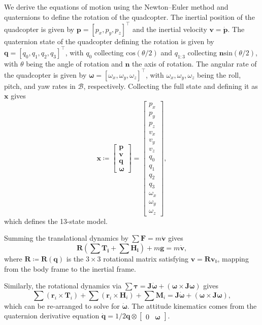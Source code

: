 \documentclass[11pt]{article}
\newcommand{\mb}[1]{\mathbf{#1}}
\begin{document}
We derive the equations of motion using the Newton--Euler method and quaternions to define the rotation of the quadcopter.
The inertial position of the quadcopter is given by $\mb{p} = [p_x, p_y, p_z]^\top$ and the inertial velocity ${\mb{v}} = \dot{\mb{p}}$.
The quaternion state of the quadcopter defining the rotation is given by $\mb{q} = [q_0, q_1, q_2, q_3]^\top$, with $q_0$ collecting $\mathrm{cos}(\theta/2)$ and $q_{1:3}$ collecting $\mb{n}\mathrm{sin}(\theta/2)$, with $\theta$ being the angle of rotation and $\mb{n}$ the axis of rotation.
The angular rate of the quadcopter is given by $\boldsymbol{\omega} = [\omega_x, \omega_y, \omega_z]^\top$, with $\omega_x, \omega_y, \omega_z$ being the roll, pitch, and yaw rates in $\mathcal{B}$, respectively.
Collecting the full state and defining it as $\mb{x}$ gives
\begin{equation}
\mb{x} \coloneqq \begin{bmatrix}
\mb{p} \\ \mb{v} \\ \mb{q} \\ \boldsymbol{\omega}
\end{bmatrix}
=
\begin{bmatrix}
p_x \\ p_y \\ p_z \\ v_x \\ v_y \\ v_z \\ q_0 \\ q_1 \\ q_2 \\ q_3 \\ \omega_x \\ \omega_y \\ \omega_z
\end{bmatrix}
,
\end{equation}
which defines the 13-state model.

Summing the translational dynamics by $\sum{\mb{F}} = m\dot{\mb{v}}$ gives
\begin{equation}
\mb{R}(\sum{\mb{T_i}} + \sum{\mb{H_i}}) + m\mb{g} = m\dot{\mb{v}},
\end{equation}
where $\mb{R} \coloneqq \mb{R}(\mb{q})$ is the $3\times 3$ rotational matrix satisfying $\mb{v} = \mb{R}\mb{v}_b$, mapping from the body frame to the inertial frame.

Similarly, the rotational dynamics via $\sum{\boldsymbol{\tau}} = \mb{J}\dot{\boldsymbol{\omega}} + (\boldsymbol{\omega} \times \mb{J}\boldsymbol{\omega})$ gives
\begin{equation}
\sum(\mb{r}_i \times \mb{T}_i) + \sum{(\mb{r}_i \times \mb{H}_i)} + \sum{\mb{M}_i} = \mb{J}\dot{\boldsymbol{\omega}} + (\boldsymbol{\omega} \times \mb{J}\boldsymbol{\omega}),
\end{equation}
which can be re-arranged to solve for $\dot{\boldsymbol{\omega}}$.
The attitude kinematics comes from the quaternion derivative equation $\dot{\mb{q}} = 1/2 \mb{q} \otimes \begin{bmatrix}0 & \boldsymbol{\omega} \end{bmatrix}$.
\end{document}
